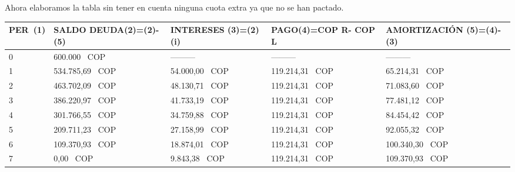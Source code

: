 
\newpage
Ahora elaboramos la tabla sin tener en cuenta ninguna cuota extra ya que no se han pactado.

\begin{spacing}{1.1}
	\begin{center}
        \footnotesize
		\begin{tabular}{|p{1cm}|p{2cm}|p{2cm}|p{2cm}|p{3cm}|}   
			\hline
			\textbf{PER\ (1)} & \textbf{SALDO DEUDA(2)=(2)-(5)} & \textbf{INTERESES  (3)=(2)(i)} & \textbf{PAGO(4)=COP R- COP L } & \textbf{AMORTIZACIÓN  (5)=(4)-(3)} \\ \hline
			
			0                 &   600.000 \ COP                     & ---------                       & ---------                   & ---------                          \\ \hline
			1                 &   534.785,69 \ COP                     &  54.000,00 \ COP                    &  119.214,31 \ COP                &  65.214,31 \ COP                        \\ \hline
			2                 &  463.702,09 \ COP                     &  48.130,71 \ COP                    &  119.214,31 \ COP                &    71.083,60 \ COP                        \\ \hline
			3                 &  386.220,97 \ COP                     &  41.733,19 \ COP                     &  119.214,31 \ COP                &   77.481,12 \ COP                        \\ \hline
			4                 &  301.766,55 \ COP                     &  34.759,88 \ COP                     &  119.214,31 \ COP                &  84.454,42 \ COP                        \\ \hline
			5                 &  209.711,23 \ COP                     &  27.158,99 \ COP                     &  119.214,31 \ COP                &   92.055,32 \ COP                        \\ \hline
			6                 &  109.370,93 \ COP                     &  18.874,01 \ COP                     &  119.214,31 \ COP                &  100.340,30 \ COP                       \\ \hline
			7                 &  0,00 \ COP                           &  9.843,38 \ COP                      &  119.214,31 \ COP                &  109.370,93 \ COP                       \\ \hline
		\end{tabular}
	\end{center}
\end{spacing}


